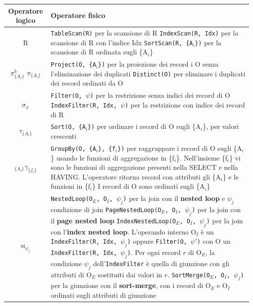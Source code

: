 \documentclass[10pt]{book}
\begin{document}
\begin{tabular}{c | l}
\textbf{Operatore logico} & \textbf{Operatore fisico}\\
\hline
R & \makecell[l]{\texttt{TableScan(R)} per la scansione di R\\\texttt{IndexScan(R, Idx)} per la scansione di R con l'indice Idx\\\texttt{SortScan(R, \{A$_i$\})} per la scansione di R ordinata sugli \{A$_i$\}}\\
\hline
\makecell{$\pi^b_{\{A_i\}}$\\$\pi_{\{A_i\}}$} & \makecell[l]{\texttt{Project(O, \{A$_i$\})} per la proiezione dei record i O senza l'eliminazione dei duplicati\\\texttt{Distinct(O)} per eliminare i duplicati dei record ordinati da O}\\
\hline
$\sigma_\psi$ & \makecell[l]{\texttt{Filter(O, $\psi$)} per la restrizione senza indici dei record di O\\\texttt{IndexFilter(R, Idx, $\psi$)} per la restrizione con indice dei record di R}\\
\hline
$\tau_{\{A_i\}}$ & \texttt{Sort(O, \{A$_i$\})} per ordinare i record di O sugli \{A$_i$\}, per valori crescenti\\
\hline
$_{\{A_i\}}\gamma_{\{f_i\}}$ & \makecell[l]{\texttt{GroupBy(O, \{A$_i$\}, \{f$_i$\})} per raggruppare i record di O sugli \{A$_i$\} usando le\\funzioni di aggregazione in \{f$_i$\}.\\
Nell'insieme \{f$_i$\} vi sono le funzioni di aggregazione presenti nella SELECT e nella HAVING.\\L'operatore ritorna record con attributi gli \{A$_i$\} e le funzioni in \{f$_i$\}\\I record di O sono ordinati sugli \{A$_i$\}}\\
\hline
$\bowtie_{\psi_j}$ & \makecell[l]{\texttt{NestedLoop(O$_E$, O$_I$, $\psi_j$)} per la join con il \textbf{nested loop} e $\psi_j$ condizione di join\\\texttt{PageNestedLoop(O$_E$, O$_I$, $\psi_j$)} per la join con il \textbf{page nested loop}\\\texttt{IndexNestedLoop(O$_E$, O$_I$, $\psi_j$)} per la join con l'\textbf{index nested loop}. L'operando interno O$_I$\\è un \texttt{IndexFilter(R, Idx, $\psi_j$)} oppure \texttt{Filter(O, $\psi'$)} con O un \texttt{IndexFilter(R, Idx, $\psi_j$)}.\\Per ogni record $r$ di O$_E$, la condizione $\psi_j$ dell'\texttt{IndexFilter} è quella di giunzione con\\gli attributi di O$_E$ sostituiti dai valori in $r$.\\\texttt{SortMerge(O$_E$, O$_I$, $\psi_j$)} per la giunzione con il \textbf{sort-merge}, con i record di O$_E$ e O$_I$ ordinati\\ sugli attributi di giunzione}
\end{tabular}
\end{document}
